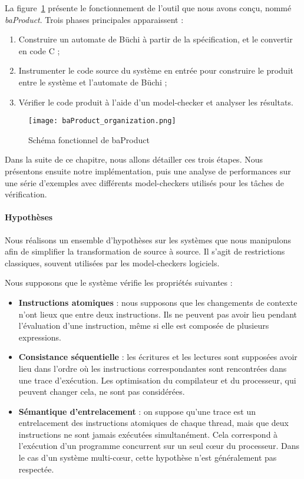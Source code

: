 La figure~\ref{fig:baProduct_func} présente le fonctionnement de l'outil que
nous avons conçu, nommé \emph{baProduct}. Trois phases principales
apparaissent :

\begin{enumerate}
\def\labelenumi{\arabic{enumi})}
  \item Construire un automate de Büchi à partir de la spécification, et le
    convertir en code C ;
  \item Instrumenter le code source du système en entrée pour construire le
    produit entre le système et l'automate de Büchi ;
  \item Vérifier le code produit à l'aide d'un model-checker et analyser les
    résultats.
\end{enumerate}

\begin{figure}
\begin{center}
  \texttt{[image: baProduct\_organization.png]}
\end{center}
\caption{Schéma fonctionnel de baProduct}
\label{fig:baProduct_func}
\end{figure}

Dans la suite de ce chapitre, nous allons détailler ces trois étapes. Nous
présentons ensuite notre implémentation, puis une analyse de performances
sur une série d'exemples avec différents model-checkers utilisés pour les tâches
de vérification.

\paragraph{Hypothèses}
Nous réalisons un ensemble d'hypothèses sur les systèmes
que nous manipulons afin de simplifier la transformation de source à source. Il
s'agit de restrictions classiques, souvent utilisées par les model-checkers
logiciels.

Nous supposons que le système vérifie les propriétés suivantes :

\begin{itemize}
  \item \textbf{Instructions atomiques} : nous supposons que les changements de
    contexte n'ont lieux que entre deux instructions. Ils ne peuvent pas avoir
    lieu pendant l'évaluation d'une instruction, même si elle est composée de
    plusieurs expressions.
  \item \textbf{Consistance séquentielle} : les écritures et les lectures sont
    supposées avoir lieu dans l'ordre où les instructions correspondantes sont
    rencontrées dans une trace d'exécution. Les optimisation du compilateur et
    du processeur, qui peuvent changer cela, ne sont pas considérées.
  \item \textbf{Sémantique d'entrelacement} : on suppose qu'une trace est un
    entrelacement des instructions atomiques de chaque thread, mais que deux
    instructions ne sont jamais exécutées simultanément. Cela correspond à
    l'exécution d'un programme concurrent sur un seul c\oe{}ur du processeur. Dans
    le cas d'un système multi-c\oe{}ur, cette hypothèse n'est généralement pas
    respectée.
\end{itemize}

